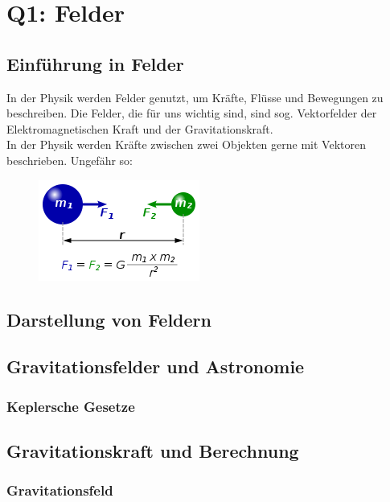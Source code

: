 \documentclass{article}
\begin{document}
    \section{Q1: Felder}

        \subsection{Einführung in Felder}
            In der Physik werden Felder genutzt, um Kräfte, Flüsse und Bewegungen zu beschreiben.
            Die Felder, die für uns wichtig sind, sind sog. Vektorfelder der Elektromagnetischen Kraft
            und der Gravitationskraft. \\
            In der Physik werden Kräfte zwischen zwei Objekten gerne mit Vektoren beschrieben. Ungefähr so:
            \begin{figure}[h]\includegraphics{graphics/universalGravitation.png}\end{figure}          
        \subsection{Darstellung von Feldern}

            

        \subsection{Gravitationsfelder und Astronomie}

            \subsubsection{Keplersche Gesetze}

            \subsection{Gravitationskraft und Berechnung}

            \subsubsection{Gravitationsfeld}
\end{document}
